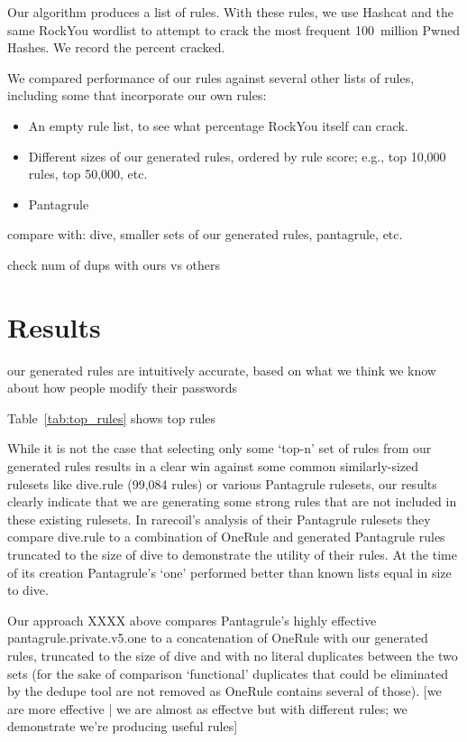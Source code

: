 \documentclass[letterpaper,twocolumn,10pt]{article}
\begin{document}
Our algorithm produces a list of rules. With these rules, we use Hashcat
and the same RockYou wordlist to attempt to crack the most frequent 100~million
Pwned Hashes. We record the percent cracked.

We compared performance of our rules against several other lists of rules,
including some that incorporate our own rules:

\begin{itemize}
\item An empty rule list, to see what percentage RockYou itself can crack.
\item Different sizes of our generated rules, ordered by rule score; e.g., top
10,000 rules, top 50,000, etc.
\item Pantagrule
\end{itemize}

compare with: dive, smaller sets of our generated rules, pantagrule, etc.

check num of dups with ours vs others

\section{Results}

our generated rules are intuitively accurate, based on what we think we know
about how people modify their passwords

Table~\ref{tab:top_rules} shows top rules

While it is not the case that selecting only some `top-n' set of rules from our
generated rules results in a clear win against some common similarly-sized rulesets
like dive.rule (99,084 rules) or various Pantagrule rulesets, our results clearly
indicate that we are generating some strong rules that are not included in these
existing rulesets. In rarecoil's analysis of their Pantagrule rulesets they compare
dive.rule to a combination of OneRule and generated Pantagrule rules truncated to
the size of dive to demonstrate the utility of their rules. At the time of its
creation Pantagrule's `one' performed better than known lists equal in size to dive.

Our approach XXXX above compares Pantagrule's highly effective pantagrule.private.v5.one
to a concatenation of OneRule with our generated rules, truncated to the size of dive
and with no literal duplicates between the two sets (for the sake of comparison `functional'
duplicates that could be eliminated by the dedupe tool are not removed as OneRule contains
several of those).  [we are more effective | we are almost as effectve but with different rules;
we demonstrate we're producing useful rules]
\end{document}
